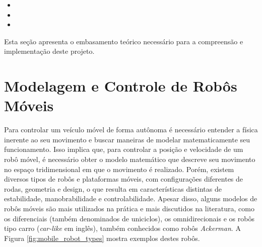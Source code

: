 
\begin{itemize}
    \item {}
    \item {}
    \item {}
\end{itemize}

Esta seção apresenta o embasamento teórico necessário para a compreensão e implementação deste projeto.


\section{Modelagem e Controle de Robôs Móveis}

Para controlar um veículo móvel de forma autônoma é necessário entender a física inerente ao seu movimento e buscar maneiras de modelar matematicamente seu funcionamento. Isso implica que, para controlar a posição e velocidade de um robô móvel, é necessário obter o modelo matemático que descreve seu movimento no espaço tridimensional em que o movimento é realizado. Porém, existem diversos tipos de robôs e plataformas móveis, com configurações diferentes de rodas, geometria e design, o que resulta em características distintas de estabilidade, manobrabilidade e controlabilidade. Apesar disso, alguns modelos de robôs móveis são mais utilizados na prática e mais discutidos na literatura, como os diferenciais (também denominados de uniciclos), os omnidirecionais e os robôs tipo carro (\textit{car-like} em inglês), também conhecidos como robôs \textit{Ackerman}. A Figura \ref{fig:mobile_robot_types} mostra exemplos destes robôs.


